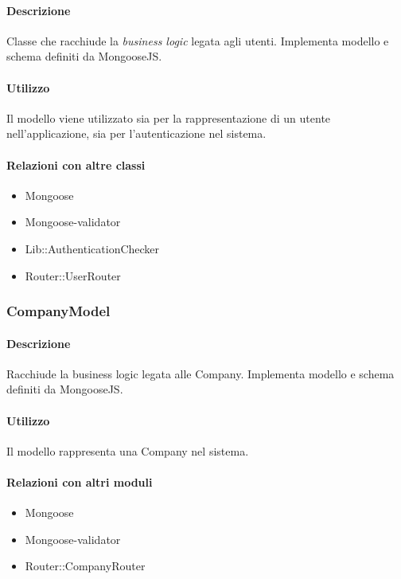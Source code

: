 \paragraph*{Descrizione}
Classe che racchiude la \textit{business logic} legata agli utenti. Implementa modello e schema definiti da MongooseJS.

\paragraph*{Utilizzo}
Il modello viene utilizzato sia per la rappresentazione di un utente nell'applicazione, sia per l'autenticazione nel sistema.

\paragraph*{Relazioni con altre classi}
\begin{itemize}
\item Mongoose
\item Mongoose-validator
\item Lib::AuthenticationChecker
\item Router::UserRouter
\end{itemize}

\subsubsection{CompanyModel}
\paragraph*{Descrizione}
Racchiude la business logic legata alle Company. Implementa modello e schema definiti da MongooseJS.

\paragraph*{Utilizzo}
Il modello rappresenta una Company nel sistema.

\paragraph*{Relazioni con altri moduli}
\begin{itemize}
\item Mongoose
\item Mongoose-validator
\item Router::CompanyRouter
\end{itemize}

